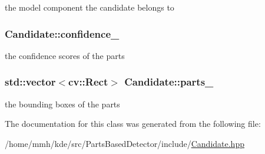 the model component the candidate belongs to 

\hypertarget{classCandidate_a31785654c1d01cda9cadf93e919b30f1}{
\subsubsection[{confidence\-\_\-}]{ Candidate\-::confidence\-\_\-\hspace{0.3cm}{\ttfamily [private]}}}\label{classCandidate_a31785654c1d01cda9cadf93e919b30f1}


the confidence scores of the parts 

\hypertarget{classCandidate_aa0e3d40adf86bff2e99f3e4234ce674b}{
\subsubsection[{parts\-\_\-}]{\setlength{\rightskip}{0pt plus 5cm}std\-::vector$<$cv\-::\-Rect$>$ Candidate\-::parts\-\_\-\hspace{0.3cm}{\ttfamily [private]}}}\label{classCandidate_aa0e3d40adf86bff2e99f3e4234ce674b}


the bounding boxes of the parts 



The documentation for this class was generated from the following file\-:\begin{DoxyCompactItemize}
\item 
/home/mmh/kde/src/\-Parts\-Based\-Detector/include/\hyperlink{Candidate_8hpp}{Candidate.\-hpp}\end{DoxyCompactItemize}
